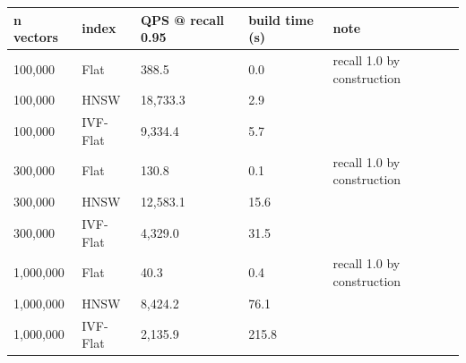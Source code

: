 \begin{tabular}{lllll}
\hline
n vectors & index & QPS @ recall 0.95 & build time (s) & note \\
\hline
100,000 & Flat & 388.5 & 0.0 & recall 1.0 by construction \\
100,000 & HNSW & 18,733.3 & 2.9 &  \\
100,000 & IVF-Flat & 9,334.4 & 5.7 &  \\
300,000 & Flat & 130.8 & 0.1 & recall 1.0 by construction \\
300,000 & HNSW & 12,583.1 & 15.6 &  \\
300,000 & IVF-Flat & 4,329.0 & 31.5 &  \\
1,000,000 & Flat & 40.3 & 0.4 & recall 1.0 by construction \\
1,000,000 & HNSW & 8,424.2 & 76.1 &  \\
1,000,000 & IVF-Flat & 2,135.9 & 215.8 &  \\
\hline
\end{tabular}
